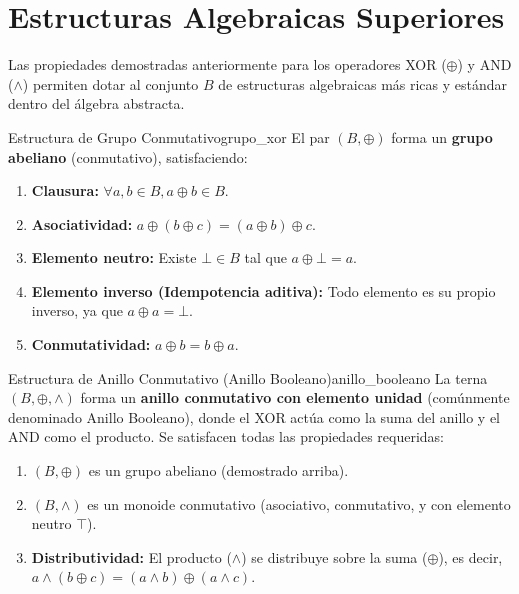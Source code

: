 \section{Estructuras Algebraicas Superiores}

Las propiedades demostradas anteriormente para los operadores XOR ($\oplus$) y AND ($\wedge$) permiten dotar al conjunto $B$ de estructuras algebraicas más ricas y estándar dentro del álgebra abstracta.

\begin{teorema}{Estructura de Grupo Conmutativo}{grupo_xor}
El par $(B, \oplus)$ forma un \textbf{grupo abeliano} (conmutativo), satisfaciendo:
\begin{enumerate}
    \item \textbf{Clausura:} $\forall a,b \in B, a \oplus b \in B$.
    \item \textbf{Asociatividad:} $a \oplus (b \oplus c) = (a \oplus b) \oplus c$.
    \item \textbf{Elemento neutro:} Existe $\bot \in B$ tal que $a \oplus \bot = a$.
    \item \textbf{Elemento inverso (Idempotencia aditiva):} Todo elemento es su propio inverso, ya que $a \oplus a = \bot$.
    \item \textbf{Conmutatividad:} $a \oplus b = b \oplus a$.
\end{enumerate}
\end{teorema}

\begin{teorema}{Estructura de Anillo Conmutativo (Anillo Booleano)}{anillo_booleano}
La terna $(B, \oplus, \wedge)$ forma un \textbf{anillo conmutativo con elemento unidad} (comúnmente denominado Anillo Booleano), donde el XOR actúa como la suma del anillo y el AND como el producto. Se satisfacen todas las propiedades requeridas:
\begin{enumerate}
    \item $(B, \oplus)$ es un grupo abeliano (demostrado arriba).
    \item $(B, \wedge)$ es un monoide conmutativo (asociativo, conmutativo, y con elemento neutro $\top$).
    \item \textbf{Distributividad:} El producto ($\wedge$) se distribuye sobre la suma ($\oplus$), es decir, $a \wedge (b \oplus c) = (a \wedge b) \oplus (a \wedge c)$.
\end{enumerate}
\end{teorema}

